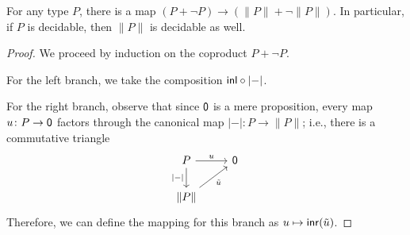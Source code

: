 \begin{lem}\label{lem:decidability-truncation}
    For any type $P$, there is a map $(P+\neg P)\to(\lVert P\rVert+\neg\lVert P\rVert)$. In particular, if $P$ is decidable, then $\lVert P\rVert$ is decidable as well.
\end{lem}

\begin{proof}
        We proceed by induction on the coproduct $P+\neg P$.
        
        For the left branch, we take the composition $\mathsf{inl}\circ\lvert-\rvert$.
        
        For the right branch, observe that since $\mathsf{0}$ is a mere proposition, every map $u\colon P\to\fun0$ factors through the canonical map $\lvert-\rvert\colon P\to\lVert P\rVert$; i.e., there is a commutative triangle
        \[
            \begin{tikzcd}
                P
                    \arrow[r,"u"]
                    \arrow[d,"\lvert-\rvert"']
                &\fun0\\
                \lVert P\rVert
                    \arrow[ur,"\tilde u"']
            \end{tikzcd}
        \]
        Therefore, we can define the mapping for this branch as $u\mapsto\mathsf{inr}(\tilde u)$.
\end{proof}

